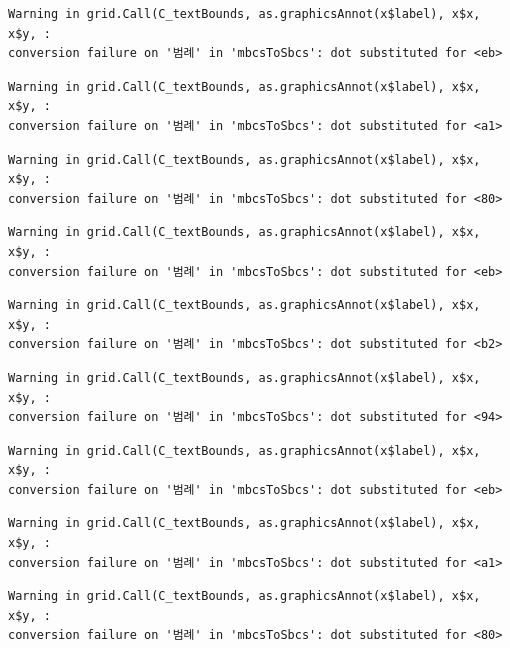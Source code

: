 \documentclass[
  letterpaper,
  DIV=11,
  numbers=noendperiod]{scrreprt}
\begin{document}
\begin{verbatim}
Warning in grid.Call(C_textBounds, as.graphicsAnnot(x$label), x$x, x$y, :
conversion failure on '범례' in 'mbcsToSbcs': dot substituted for <eb>
\end{verbatim}

\begin{verbatim}
Warning in grid.Call(C_textBounds, as.graphicsAnnot(x$label), x$x, x$y, :
conversion failure on '범례' in 'mbcsToSbcs': dot substituted for <a1>
\end{verbatim}

\begin{verbatim}
Warning in grid.Call(C_textBounds, as.graphicsAnnot(x$label), x$x, x$y, :
conversion failure on '범례' in 'mbcsToSbcs': dot substituted for <80>
\end{verbatim}

\begin{verbatim}
Warning in grid.Call(C_textBounds, as.graphicsAnnot(x$label), x$x, x$y, :
conversion failure on '범례' in 'mbcsToSbcs': dot substituted for <eb>
\end{verbatim}

\begin{verbatim}
Warning in grid.Call(C_textBounds, as.graphicsAnnot(x$label), x$x, x$y, :
conversion failure on '범례' in 'mbcsToSbcs': dot substituted for <b2>
\end{verbatim}

\begin{verbatim}
Warning in grid.Call(C_textBounds, as.graphicsAnnot(x$label), x$x, x$y, :
conversion failure on '범례' in 'mbcsToSbcs': dot substituted for <94>
\end{verbatim}

\begin{verbatim}
Warning in grid.Call(C_textBounds, as.graphicsAnnot(x$label), x$x, x$y, :
conversion failure on '범례' in 'mbcsToSbcs': dot substituted for <eb>
\end{verbatim}

\begin{verbatim}
Warning in grid.Call(C_textBounds, as.graphicsAnnot(x$label), x$x, x$y, :
conversion failure on '범례' in 'mbcsToSbcs': dot substituted for <a1>
\end{verbatim}

\begin{verbatim}
Warning in grid.Call(C_textBounds, as.graphicsAnnot(x$label), x$x, x$y, :
conversion failure on '범례' in 'mbcsToSbcs': dot substituted for <80>
\end{verbatim}
\end{document}
